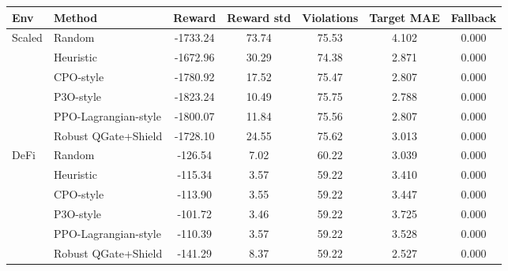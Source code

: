 \small
\setlength{\tabcolsep}{6pt}
\begin{tabular}{llccccc}
\toprule
Env & Method & Reward & Reward std & Violations & Target MAE & Fallback \\
\midrule
Scaled & Random & -1733.24 & 73.74 & 75.53 & 4.102 & 0.000 \\
 & Heuristic & -1672.96 & 30.29 & 74.38 & 2.871 & 0.000 \\
 & CPO-style & -1780.92 & 17.52 & 75.47 & 2.807 & 0.000 \\
 & P3O-style & -1823.24 & 10.49 & 75.75 & 2.788 & 0.000 \\
 & PPO-Lagrangian-style & -1800.07 & 11.84 & 75.56 & 2.807 & 0.000 \\
 & Robust QGate+Shield & -1728.10 & 24.55 & 75.62 & 3.013 & 0.000 \\
\midrule
DeFi & Random & -126.54 & 7.02 & 60.22 & 3.039 & 0.000 \\
 & Heuristic & -115.34 & 3.57 & 59.22 & 3.410 & 0.000 \\
 & CPO-style & -113.90 & 3.55 & 59.22 & 3.447 & 0.000 \\
 & P3O-style & -101.72 & 3.46 & 59.22 & 3.725 & 0.000 \\
 & PPO-Lagrangian-style & -110.39 & 3.57 & 59.22 & 3.528 & 0.000 \\
 & Robust QGate+Shield & -141.29 & 8.37 & 59.22 & 2.527 & 0.000 \\
\bottomrule
\end{tabular}
